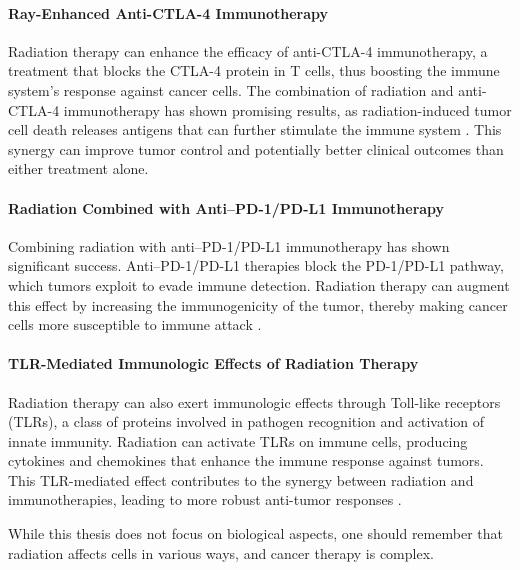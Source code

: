 \paragraph{Ray-Enhanced Anti-CTLA-4 Immunotherapy}
Radiation therapy can enhance the efficacy of anti-CTLA-4 immunotherapy, a treatment that blocks the CTLA-4 protein in T cells, thus boosting the immune system's response against cancer cells.
The combination of radiation and anti-CTLA-4 immunotherapy has shown promising results, as radiation-induced tumor cell death releases antigens that can further stimulate the immune system \cite{Vanpouillebox2015}.
This synergy can improve tumor control and potentially better clinical outcomes than either treatment alone.

\paragraph{Radiation Combined with Anti–PD-1/PD-L1 Immunotherapy}
Combining radiation with anti–PD-1/PD-L1 immunotherapy has shown significant success.
Anti–PD-1/PD-L1 therapies block the PD-1/PD-L1 pathway, which tumors exploit to evade immune detection.
Radiation therapy can augment this effect by increasing the immunogenicity of the tumor, thereby making cancer cells more susceptible to immune attack \cite{He2021}.

\paragraph{TLR-Mediated Immunologic Effects of Radiation Therapy}
Radiation therapy can also exert immunologic effects through Toll-like receptors (TLRs), a class of proteins involved in pathogen recognition and activation of innate immunity.
Radiation can activate TLRs on immune cells, producing cytokines and chemokines that enhance the immune response against tumors.
This TLR-mediated effect contributes to the synergy between radiation and immunotherapies, leading to more robust anti-tumor responses \cite{Walshan2020}.

While this thesis does not focus on biological aspects, one should remember that radiation affects cells in various ways, and cancer therapy is complex.






